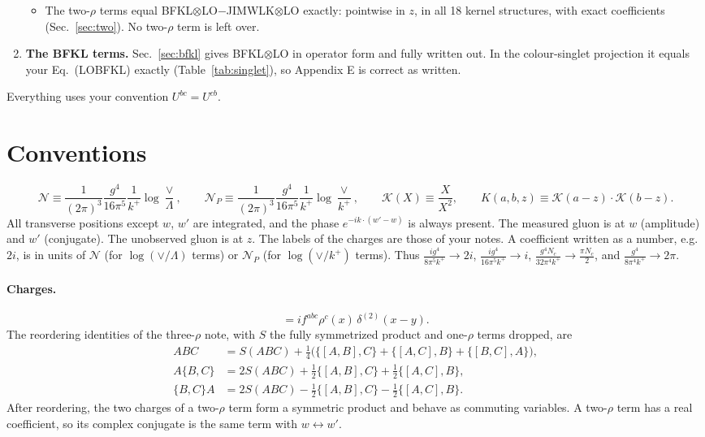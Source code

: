\documentclass[10pt]{article}
\numberwithin{equation}{section}
\newcommand{\KK}{\mathcal K}
\newcommand{\NN}{\mathcal N}
\newcommand{\NP}{\mathcal N_{P}}
\begin{document}
\begin{enumerate}
\begin{itemize}
\item The two-$\rho$ terms equal BFKL$\otimes$LO$-$JIMWLK$\otimes$LO exactly: pointwise in $z$, in all 18 kernel structures, with exact coefficients (Sec.~\ref{sec:two}). No two-$\rho$ term is left over.
\end{itemize}
\item \textbf{The BFKL terms.} Sec.~\ref{sec:bfkl} gives BFKL$\otimes$LO in operator form and fully written out. In the colour-singlet projection it equals your Eq.~(LOBFKL) exactly (Table~\ref{tab:singlet}), so Appendix E is correct as written.
\end{enumerate}
Everything uses your convention $U^{bc}=U^{cb}$.

\section{Conventions}\label{sec:conv}
\begin{equation}
\NN\equiv\frac{1}{(2\pi)^3}\frac{g^4}{16\pi^5}\frac{1}{k^+}\log\frac{\vee}{\Lambda},\qquad
\NP\equiv\frac{1}{(2\pi)^3}\frac{g^4}{16\pi^5}\frac{1}{k^+}\log\frac{\vee}{k^+},\qquad
\KK(X)\equiv\frac{X}{X^2},\qquad K(a,b,z)\equiv\KK(a-z)\cdot\KK(b-z).
\end{equation}
All transverse positions except $w$, $w'$ are integrated, and the phase $e^{-ik\cdot(w'-w)}$ is always present. The measured gluon is at $w$ (amplitude) and $w'$ (conjugate). The unobserved gluon is at $z$. The labels of the charges are those of your notes. A coefficient written as a number, e.g.\ $2i$, is in units of $\NN$ (for $\log(\vee/\Lambda)$ terms) or $\NP$ (for $\log(\vee/k^+)$ terms). Thus $\frac{ig^4}{8\pi^5k^+}\to 2i$, $\frac{ig^4}{16\pi^5k^+}\to i$, $\frac{g^4N_c}{32\pi^4k^+}\to\frac{\pi N_c}{2}$, and $\frac{g^4}{8\pi^4k^+}\to 2\pi$.

\paragraph{Charges.}
\begin{equation}
[\rho^a(x),\rho^b(y)]=if^{abc}\rho^c(x)\,\delta^{(2)}(x-y).
\label{eq:comm}
\end{equation}
The reordering identities of the three-$\rho$ note, with $S$ the fully symmetrized product and one-$\rho$ terms dropped, are
\begin{align}
ABC&=S(ABC)+\tfrac14\Big(\big\{[A,B],C\big\}+\big\{[A,C],B\big\}+\big\{[B,C],A\big\}\Big),\label{eq:plain}\\
A\{B,C\}&=2S(ABC)+\tfrac12\big\{[A,B],C\big\}+\tfrac12\big\{[A,C],B\big\},\label{eq:Aanti}\\
\{B,C\}A&=2S(ABC)-\tfrac12\big\{[A,B],C\big\}-\tfrac12\big\{[A,C],B\big\}.\label{eq:antiA}
\end{align}
After reordering, the two charges of a two-$\rho$ term form a symmetric product and behave as commuting variables. A two-$\rho$ term has a real coefficient, so its complex conjugate is the same term with $w\leftrightarrow w'$.
\end{document}
